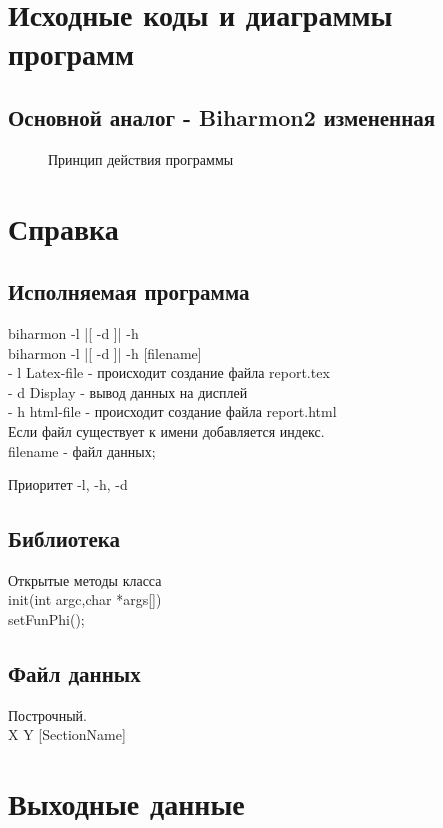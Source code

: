 \chapter{Исходные коды и диаграммы программ}
\section{Основной аналог - Biharmon2 измененная}
%
\begin{figure}[hp]
\begin{small}

\end{small}
\caption{Принцип действия программы}
\end{figure}
\chapter{Справка}
\section{Исполняемая программа}
biharmon -l |[ -d ]| -h\\
biharmon -l |[ -d ]| -h [filename]\\
- l	Latex-file - происходит создание файла report.tex\\
- d	Display - вывод данных на дисплей\\
- h	html-file - происходит создание файла report.html\\
Если файл существует к имени добавляется индекс. \\

filename - файл данных;

Приоритет -l, -h, -d \\
\section{Библиотека}
Открытые методы класса\\
init(int argc,char *args[])\\
setFunPhi();\\

\section{Файл данных}
Построчный.\\
X Y [SectionName]
\chapter{Выходные данные}
